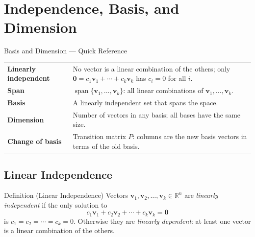 
\section{Independence, Basis, and Dimension}

\begin{toolkitbox}{Basis and Dimension --- Quick Reference}
\begin{tabular}{@{}p{}p{}@{}}
\textbf{Linearly independent} & No vector is a linear combination of the others; only $\mathbf{0} = c_1\mathbf{v}_1 + \cdots + c_k\mathbf{v}_k$ has $c_i = 0$ for all $i$. \\[4pt]
\textbf{Span}                 & $\operatorname{span}\{\mathbf{v}_1,\ldots,\mathbf{v}_k\}$: all linear combinations of $\mathbf{v}_1,\ldots,\mathbf{v}_k$. \\[4pt]
\textbf{Basis}                & A linearly independent set that spans the space. \\[4pt]
\textbf{Dimension}            & Number of vectors in any basis; all bases have the same size. \\[4pt]
\textbf{Change of basis}      & Transition matrix $P$: columns are the new basis vectors in terms of the old basis. \\
\end{tabular}
\end{toolkitbox}

\subsection*{Linear Independence}

\begin{propositionbox}{Definition (Linear Independence)}
Vectors $\mathbf{v}_1, \mathbf{v}_2, \ldots, \mathbf{v}_k \in \mathbb{R}^n$ are
\emph{linearly independent} if the only solution to
\[
  c_1\mathbf{v}_1 + c_2\mathbf{v}_2 + \cdots + c_k\mathbf{v}_k = \mathbf{0}
\]
is $c_1 = c_2 = \cdots = c_k = 0$.
Otherwise they are \emph{linearly dependent}: at least one vector is
a linear combination of the others.
\end{propositionbox}

